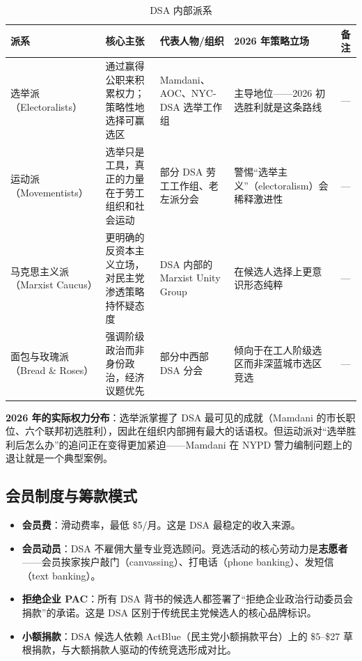 \documentclass[12pt,a4paper]{ctexart}
\begin{document}
\begin{table}[h]
\centering
\caption{DSA 内部派系}
\begin{tabular}{@{}lp{3.6cm}p{3.8cm}p{2.8cm}p{3.4cm}@{}}
\toprule
\textbf{派系} & \textbf{核心主张} & \textbf{代表人物/组织} & \textbf{2026 年策略立场} & \textbf{备注} \\
\midrule
选举派（Electoralists） & 通过赢得公职来积累权力；策略性地选择可赢选区 & Mamdani、AOC、NYC-DSA 选举工作组 & 主导地位——2026 初选胜利就是这条路线 & --- \\
运动派（Movementists） & 选举只是工具，真正的力量在于劳工组织和社会运动 & 部分 DSA 劳工工作组、老左派分会 & 警惕``选举主义''（electoralism）会稀释激进性 & --- \\
马克思主义派（Marxist Caucus） & 更明确的反资本主义立场，对民主党渗透策略持怀疑态度 & DSA 内部的 Marxist Unity Group & 在候选人选择上更意识形态纯粹 & --- \\
面包与玫瑰派（Bread \& Roses） & 强调阶级政治而非身份政治，经济议题优先 & 部分中西部 DSA 分会 & 倾向于在工人阶级选区而非深蓝城市选区竞选 & --- \\
\bottomrule
\end{tabular}
\end{table}

\textbf{2026 年的实际权力分布}：选举派掌握了 DSA 最可见的成就（Mamdani 的市长职位、六个联邦初选胜利），因此在组织内部拥有最大的话语权。但运动派对``选举胜利后怎么办''的追问正在变得更加紧迫——Mamdani 在 NYPD 警力编制问题上的退让就是一个典型案例。

\subsection{会员制度与筹款模式}

\begin{itemize}
  \item \textbf{会员费}：滑动费率，最低 \$5/月。这是 DSA 最稳定的收入来源。
  \item \textbf{会员动员}：DSA 不雇佣大量专业竞选顾问。竞选活动的核心劳动力是\textbf{志愿者}——会员挨家挨户敲门（canvassing）、打电话（phone banking）、发短信（text banking）。
  \item \textbf{拒绝企业 PAC}：所有 DSA 背书的候选人都签署了``拒绝企业政治行动委员会捐款''的承诺。这是 DSA 区别于传统民主党候选人的核心品牌标识。
  \item \textbf{小额捐款}：DSA 候选人依赖 ActBlue（民主党小额捐款平台）上的 \$5--\$27 草根捐款，与大额捐款人驱动的传统竞选形成对比。
\end{itemize}
\end{document}

